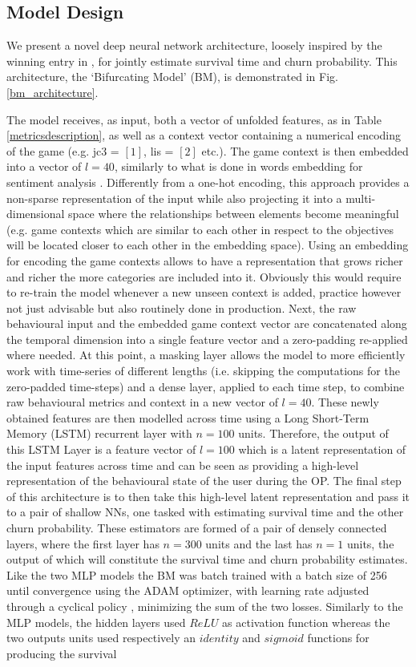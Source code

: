 \subsection{Model Design}
We present a novel deep neural network architecture, loosely inspired by the winning entry in \cite{lee2018game}, for jointly estimate survival time and churn probability. This architecture, the `Bifurcating Model' (BM), is demonstrated in Fig. \ref{bm_architecture}. 

The model receives, as input, both a vector of unfolded features, as in Table \ref{metricsdescription}, as well as a context vector containing a numerical encoding of the game (e.g. jc3 = $[1]$, lis = $[2]$ etc.). The game context is then embedded into a vector of $l = 40$, similarly to what is done in words embedding for sentiment analysis \cite{chollet2015keras}. Differently from a one-hot encoding, this approach provides a non-sparse representation of the input while also projecting it into a multi-dimensional space where the relationships between elements become meaningful (e.g. game contexts which are similar to each other in respect to the objectives will be located closer to each other in the embedding space). Using an embedding for encoding the game contexts allows to have a representation that grows richer and richer the more categories are included into it. Obviously this would require to re-train the model whenever a new unseen context is added, practice however not just advisable but also routinely done in production. Next, the raw behavioural input and the embedded game context vector are concatenated along the temporal dimension into a single feature vector and a zero-padding re-applied where needed. At this point, a masking layer allows the model to more efficiently work with time-series of different lengths (i.e. skipping the computations for the zero-padded time-steps) and a dense layer, applied to each time step, to combine raw behavioural metrics and context in a new vector of $l = 40$. These newly obtained features are then modelled across time using a Long Short-Term Memory (LSTM) recurrent layer with $n = 100$ units. Therefore, the output of this LSTM Layer is a feature vector of $l = 100$ which is a latent representation of the input features across time and can be seen as providing a high-level representation of the behavioural state of the user during the OP. The final step of this architecture is to then take this high-level latent representation and pass it to a pair of shallow NNs, one tasked with estimating survival time and the other churn probability. These estimators are formed of a pair of densely connected layers, where the first layer has $n = 300$ units and the last has $n = 1$ units, the output of which will constitute the survival time and churn probability estimates. Like the two MLP models the BM was batch trained with a batch size of 256 until convergence using the ADAM optimizer, with learning rate adjusted through a cyclical policy \cite{smith2017cyclical, chollet2015keras}, minimizing the sum of the two losses. Similarly to the MLP models, the hidden layers used $ReLU$ as activation function whereas the two outputs units used respectively an $identity$ and $sigmoid$ functions for producing the survival 